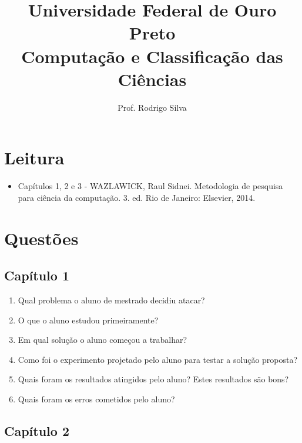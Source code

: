 \documentclass{article}
\title{\vspace{-2 cm}Universidade Federal de Ouro Preto \\ Computação e Classificação das Ciências}
\author{Prof. Rodrigo Silva}
\date{}
\begin{document}
\maketitle

\section*{Leitura}

\begin{itemize}
    \item Capítulos 1, 2 e 3 - WAZLAWICK, Raul Sidnei. Metodologia de pesquisa para ciência da computação. 3. ed. Rio de Janeiro: Elsevier, 2014.
\end{itemize}

\section{Questões}

\subsection{Capítulo 1}

\begin{enumerate}

    \item Qual problema o aluno de mestrado decidiu atacar?
    \item O que o aluno estudou primeiramente?
    \item Em qual solução o aluno começou a trabalhar?  
    \item Como foi o experimento projetado pelo aluno para testar a solução proposta?
    \item Quais foram os resultados atingidos pelo aluno? Estes resultados são bons? 
    \item Quais foram os erros cometidos pelo aluno?

\end{enumerate}

\subsection{Capítulo 2}
\end{document}
